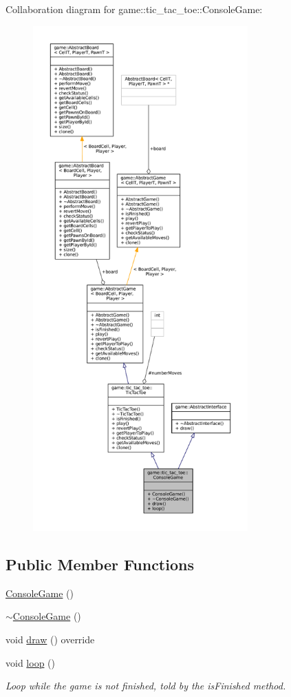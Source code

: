 Collaboration diagram for game\+:\+:tic\+\_\+tac\+\_\+toe\+:\+:Console\+Game\+:
\nopagebreak
\begin{figure}[H]
\begin{center}
\leavevmode
\includegraphics[height=550pt]{classgame_1_1tic__tac__toe_1_1_console_game__coll__graph}
\end{center}
\end{figure}
\subsection*{Public Member Functions}
\begin{DoxyCompactItemize}
\item 
\hyperlink{classgame_1_1tic__tac__toe_1_1_console_game_aa9b5bcb5a43dfc071ab21009646bd4bd}{Console\+Game} ()
\item 
\hyperlink{classgame_1_1tic__tac__toe_1_1_console_game_a44fbe396d79ac0abb128636b32d2f398}{$\sim$\+Console\+Game} ()
\item 
void \hyperlink{classgame_1_1tic__tac__toe_1_1_console_game_a209ec289b23e0325417d50a31a323b37}{draw} () override
\item 
void \hyperlink{classgame_1_1tic__tac__toe_1_1_console_game_a06b07e4c713a60999258b0b573b02a33}{loop} ()
\begin{DoxyCompactList}\small\item\em Loop while the game is not finished, told by the {\ttfamily is\+Finished} method. \end{DoxyCompactList}\end{DoxyCompactItemize}
